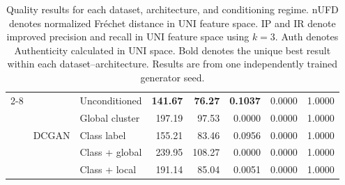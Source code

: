 \begin{table}[htbp]
\begin{tabular}{lllrrrrr}
\cmidrule(lr){2-8}
 & \multirow{5}{*}{DCGAN} & Unconditioned & \textbf{141.67} & \textbf{76.27} & \textbf{0.1037} & 0.0000 & 1.0000 \\
 &  & Global cluster & 197.19 & 97.53 & 0.0000 & 0.0000 & 1.0000 \\
 &  & Class label & 155.21 & 83.46 & 0.0956 & 0.0000 & 1.0000 \\
 &  & Class + global & 239.95 & 108.27 & 0.0000 & 0.0000 & 1.0000 \\
 &  & Class + local & 191.14 & 85.04 & 0.0051 & 0.0000 & 1.0000 \\
\bottomrule
\end{tabular}
\caption{Quality results for each dataset, architecture, and conditioning regime. nUFD denotes normalized Fr\'echet distance in UNI feature space. IP and IR denote improved precision and recall in UNI feature space using $k=3$. Auth denotes Authenticity calculated in UNI space. Bold denotes the unique best result within each dataset--architecture. Results are from one independently trained generator seed.}
\label{tab:original-quality-authenticity}
\end{table}
